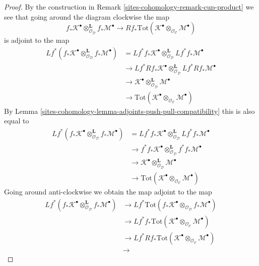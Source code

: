 \begin{proof}
By the construction in Remark \ref{sites-cohomology-remark-cup-product} we see that
going around the diagram clockwise the map
$$
f_*\mathcal{K}^\bullet
\otimes_{\mathcal{O}_\mathcal{D}}^\mathbf{L}
f_*\mathcal{M}^\bullet
\longrightarrow
Rf_*\text{Tot}(\mathcal{K}^\bullet
\otimes_{\mathcal{O}_\mathcal{C}}
\mathcal{M}^\bullet)
$$
is adjoint to the map
\begin{align*}
Lf^*(f_*\mathcal{K}^\bullet
\otimes_{\mathcal{O}_\mathcal{D}}^\mathbf{L}
f_*\mathcal{M}^\bullet)
& =
Lf^*f_*\mathcal{K}^\bullet
\otimes_{\mathcal{O}_\mathcal{D}}^\mathbf{L}
Lf^*f_*\mathcal{M}^\bullet \\
& \to
Lf^*Rf_*\mathcal{K}^\bullet
\otimes_{\mathcal{O}_\mathcal{D}}^\mathbf{L}
Lf^*Rf_*\mathcal{M}^\bullet \\
& \to
\mathcal{K}^\bullet
\otimes_{\mathcal{O}_\mathcal{D}}^\mathbf{L}
\mathcal{M}^\bullet \\
& \to
\text{Tot}(\mathcal{K}^\bullet
\otimes_{\mathcal{O}_\mathcal{C}}
\mathcal{M}^\bullet)
\end{align*}
By Lemma \ref{sites-cohomology-lemma-adjoints-push-pull-compatibility} this is also equal to
\begin{align*}
Lf^*(f_*\mathcal{K}^\bullet
\otimes_{\mathcal{O}_\mathcal{D}}^\mathbf{L}
f_*\mathcal{M}^\bullet)
& =
Lf^*f_*\mathcal{K}^\bullet
\otimes_{\mathcal{O}_\mathcal{D}}^\mathbf{L}
Lf^*f_*\mathcal{M}^\bullet \\
& \to
f^*f_*\mathcal{K}^\bullet
\otimes_{\mathcal{O}_\mathcal{D}}^\mathbf{L}
f^*f_*\mathcal{M}^\bullet \\
& \to
\mathcal{K}^\bullet
\otimes_{\mathcal{O}_\mathcal{D}}^\mathbf{L}
\mathcal{M}^\bullet \\
& \to
\text{Tot}(\mathcal{K}^\bullet
\otimes_{\mathcal{O}_\mathcal{C}}
\mathcal{M}^\bullet)
\end{align*}
Going around anti-clockwise we obtain the map adjoint to the map
\begin{align*}
Lf^*(f_*\mathcal{K}^\bullet
\otimes_{\mathcal{O}_\mathcal{D}}^\mathbf{L}
f_*\mathcal{M}^\bullet)
& \to
Lf^*\text{Tot}(
f_*\mathcal{K}^\bullet
\otimes_{\mathcal{O}_\mathcal{D}}
f_*\mathcal{M}^\bullet) \\
& \to
Lf^*f_*\text{Tot}(\mathcal{K}^\bullet
\otimes_{\mathcal{O}_\mathcal{C}}
\mathcal{M}^\bullet) \\
& \to
Lf^*Rf_*\text{Tot}(\mathcal{K}^\bullet
\otimes_{\mathcal{O}_\mathcal{C}}
\mathcal{M}^\bullet) \\
& \to

\end{align*}
\end{proof}
